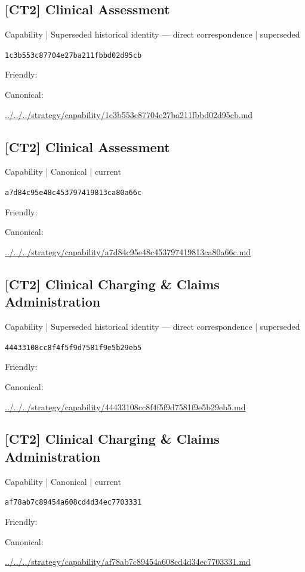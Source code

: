 \documentclass[10pt,a4paper]{article}
\begin{document}
\subsection*{[CT2] Clinical Assessment}
{\small Capability | Superseded historical identity — direct correspondence | superseded}\par
\texttt{1c3b553c87704e27ba211fbbd02d95cb}\par
Friendly: \par
Canonical: \par
{\footnotesize\url{../../../strategy/capability/1c3b553c87704e27ba211fbbd02d95cb.md}}\par
\subsection*{[CT2] Clinical Assessment}
{\small Capability | Canonical | current}\par
\texttt{a7d84c95e48c453797419813ca80a66c}\par
Friendly: \par
Canonical: \par
{\footnotesize\url{../../../strategy/capability/a7d84c95e48c453797419813ca80a66c.md}}\par
\subsection*{[CT2] Clinical Charging \& Claims Administration}
{\small Capability | Superseded historical identity — direct correspondence | superseded}\par
\texttt{44433108cc8f4f5f9d7581f9e5b29eb5}\par
Friendly: \par
Canonical: \par
{\footnotesize\url{../../../strategy/capability/44433108cc8f4f5f9d7581f9e5b29eb5.md}}\par
\subsection*{[CT2] Clinical Charging \& Claims Administration}
{\small Capability | Canonical | current}\par
\texttt{af78ab7c89454a608cd4d34ec7703331}\par
Friendly: \par
Canonical: \par
{\footnotesize\url{../../../strategy/capability/af78ab7c89454a608cd4d34ec7703331.md}}\par
\end{document}
